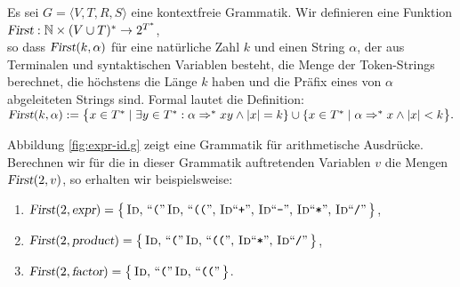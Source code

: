 \begin{Definition}
  Es sei $G = \langle V, T, R, S \rangle$ eine kontextfreie Grammatik. Wir definieren eine Funktion
  \\[0.2cm]
  \hspace*{1.3cm}
  $\textsl{First}: \mathbb{N} \times (V \cup T)^* \rightarrow 2^{T^*}$,
  \\[0.2cm]
  so dass $\textsl{First}(k,\alpha)$ f\"ur eine nat\"urliche Zahl $k$ und einen String $\alpha$, der aus
  Terminalen und syntaktischen Variablen besteht, die Menge der Token-Strings berechnet, die
  h\"ochstens die L\"ange $k$ haben und die Pr\"afix eines von $\alpha$ abgeleiteten Strings sind.  Formal
  lautet die Definition:
  \\[0.2cm]
  \hspace*{1.3cm}
  $\textsl{First}(k, \alpha) := 
  \bigl\{ x \in T^* \mid \exists y \in T^*: \alpha \Rightarrow^* x y \wedge |x| = k \} \cup
  \{ x \in T^* \mid \alpha \Rightarrow^* x \wedge |x| < k \bigr\}.$ \eox
\end{Definition}

\example
Abbildung \ref{fig:expr-id.g} zeigt eine Grammatik f\"ur arithmetische Ausdr\"ucke.
Berechnen wir f\"ur die in dieser Grammatik auftretenden Variablen $v$ die Mengen
$\textsl{First}(2,v)$, so erhalten wir beispielsweise:
\begin{enumerate}
\item $\textsl{First}(2, \textsl{expr}) = 
      \bigl\{\, \textsc{Id}, \,\mbox{``\texttt{(}''}\, \textsc{Id},\, \mbox{``\texttt{((}''},\,
      \textsc{Id} \mbox{``\texttt{+}''},\, \textsc{Id} \mbox{``\texttt{-}''},\,
      \textsc{Id} \mbox{``\texttt{*}''},\, \textsc{Id} \mbox{``\texttt{/}''}\,
      \bigr\}$,
\item $\textsl{First}(2, \textsl{product}) = 
      \bigl\{\, \textsc{Id}, \,\mbox{``\texttt{(}''}\, \textsc{Id},\, \mbox{``\texttt{((}''},\,
      \textsc{Id} \mbox{``\texttt{*}''},\, \textsc{Id} \mbox{``\texttt{/}''}\,
      \bigr\}$,
\item $\textsl{First}(2, \textsl{factor}) = 
      \bigl\{\, \textsc{Id}, \,\mbox{``\texttt{(}''}\, \textsc{Id},\, \mbox{``\texttt{((}''}\,
      \bigr\}$.
\end{enumerate}


